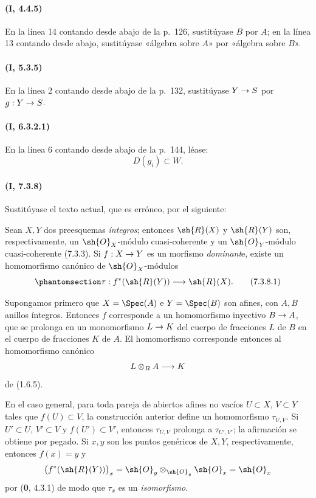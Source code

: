 \documentclass[oneside,10pt]{amsart}
\makeatletter
\newcommand{\ega@arrow}[2]{\mathchoice{#1}{#2}{#2}{#2}}
\renewcommand{\to}{\ega@arrow{\longrightarrow}{\rightarrow}}
\newcommand{\oldpage}[2][]{\marginnote{\normalfont\footnotesize\textbf{#1}~|~#2}\ignorespaces}
\let\EGAOriginalLabel\label
\renewcommand{\label}[1]{\phantomsection\EGAOriginalLabel{#1}}
\makeatother
\begin{document}
\paragraph{(I, 4.4.5)}
En la línea 14 contando desde abajo de la p.~126, sustitúyase $B$ por
$A$; en la línea 13 contando desde abajo, sustitúyase «álgebra sobre
$A$» por «álgebra sobre $B$».

\paragraph{(I, 5.3.5)}
En la línea 2 contando desde abajo de la p.~132, sustitúyase $Y\to S$
por $g:Y\to S$.

\paragraph{(I, 6.3.2.1)}
En la línea 6 contando desde abajo de la p.~144, léase:
\[
  D(g_i)\subset W.
\]

\paragraph{(I, 7.3.8)}
Sustitúyase el texto actual, que es erróneo, por el siguiente:

Sean $X,Y$ dos preesquemas \emph{íntegros}; entonces $\sh{R}(X)$ y
$\sh{R}(Y)$ son, respectivamente, un $\sh{O}_X$-módulo
cuasi-coherente y un $\sh{O}_Y$-módulo cuasi-coherente (7.3.3). Si
$f:X\to Y$ es un morfismo \emph{dominant}e, existe un homomorfismo canónico
de $\sh{O}_X$-módulos
\oldpage[II]{222}
\begin{equation}
\label{ega2:addendum:I.7.3.8.1}
  \tau:f^*(\sh{R}(Y))\to\sh{R}(X).
\tag{7.3.8.1}
\end{equation}

Supongamos primero que $X=\Spec(A)$ e $Y=\Spec(B)$ son afines, con
$A,B$ anillos íntegros. Entonces $f$ corresponde a un homomorfismo
inyectivo $B\to A$, que se prolonga en un monomorfismo $L\to K$ del
cuerpo de fracciones $L$ de $B$ en el cuerpo de fracciones $K$ de $A$.
El homomorfismo  corresponde entonces al homomorfismo
canónico
\[
  L\otimes_B A\to K
\]
de (1.6.5).

En el caso general, para toda pareja de abiertos afines no vacíos
$U\subset X$, $V\subset Y$ tales que $f(U)\subset V$, la construcción
anterior define un homomorfismo $\tau_{U,V}$. Si $U'\subset U$,
$V'\subset V$ y $f(U')\subset V'$, entonces $\tau_{U,V}$ prolonga a
$\tau_{U',V'}$; la afirmación se obtiene por pegado. Si $x,y$ son los
puntos genéricos de $X,Y$, respectivamente, entonces $f(x)=y$ y
\[
  \bigl(f^*(\sh{R}(Y))\bigr)_x
  =\sh{O}_y\otimes_{\sh{O}_y}\sh{O}_x
  =\sh{O}_x
\]
por (\textbf 0, 4.3.1) de modo que $\tau_x$ es un \emph{isomorfismo}.
\end{document}
